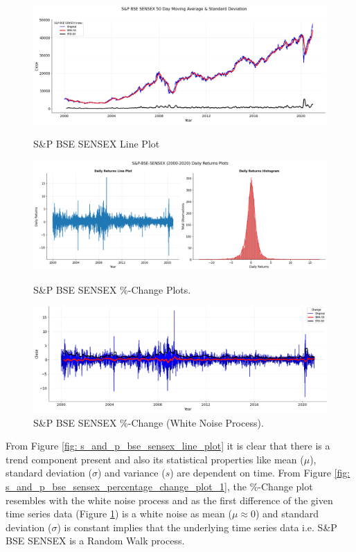 \documentclass[conference]{IEEEtran}
\begin{document}
\begin{figure}[htbp]
    \centering
	\includegraphics[width = 0.50 \textwidth]{images/SENSEX-Line-Plot.png}
	\caption{S\&P BSE SENSEX Line Plot}
	\label{fig: s_and_p_bse_sensex_line_plot}
	\includegraphics[width = 0.50 \textwidth]{images/SENSEX 2000-2020 Change Plot.png}
	\caption{S\&P BSE SENSEX \%-Change Plots.}
	\label{fig: s_and_p_bse_sensex_percentage_change_plot_1}
	\includegraphics[width = 0.50 \textwidth]{images/BSE SENSEX White Noise Part.png}
	\caption{S\&P BSE SENSEX \%-Change (White Noise Process).}
	\label{fig: s_and_p_bse_sensex_percentage_change_plot_2}
\end{figure}
	
From Figure \ref{fig: s_and_p_bse_sensex_line_plot} it is clear that there is a trend component present and also its statistical properties like mean ($\mu$), standard deviation ($\sigma$) and variance ($s$) are dependent on time.
From Figure \ref{fig: s_and_p_bse_sensex_percentage_change_plot_1}, the \%-Change plot resembles with the white noise process and as the first difference of the given time series data (Figure \ref{fig: s_and_p_bse_sensex_percentage_change_plot_2}) is a white noise as mean ($\mu \approx 0$) and standard deviation ($\sigma$) is constant implies that the underlying time series data i.e. S\&P BSE SENSEX is a Random Walk process.
\end{document}
